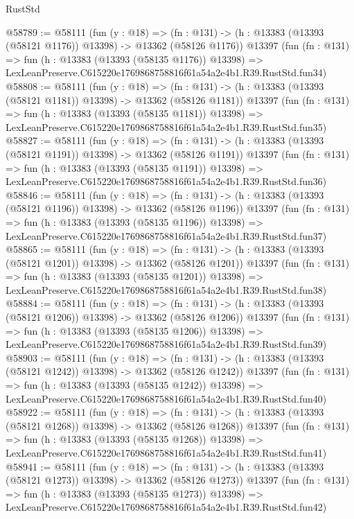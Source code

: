 \begin{lexlean}{RustStd}
\begin{coremodule}
@58789 := @58111
    (fun (y : @18) =>
    (fn : @131) -> (h : @13383 (@13393 (@58121 @1176)) @13398) -> @13362 (@58126 @1176))
    @13397
    (fun (fn : @131) =>
    fun (h : @13383 (@13393 (@58135 @1176)) @13398) =>
    LexLeanPreserve.C615220e1769868758816f61a54a2e4b1.R39.RustStd.fun34)
@58808 := @58111
    (fun (y : @18) =>
    (fn : @131) -> (h : @13383 (@13393 (@58121 @1181)) @13398) -> @13362 (@58126 @1181))
    @13397
    (fun (fn : @131) =>
    fun (h : @13383 (@13393 (@58135 @1181)) @13398) =>
    LexLeanPreserve.C615220e1769868758816f61a54a2e4b1.R39.RustStd.fun35)
@58827 := @58111
    (fun (y : @18) =>
    (fn : @131) -> (h : @13383 (@13393 (@58121 @1191)) @13398) -> @13362 (@58126 @1191))
    @13397
    (fun (fn : @131) =>
    fun (h : @13383 (@13393 (@58135 @1191)) @13398) =>
    LexLeanPreserve.C615220e1769868758816f61a54a2e4b1.R39.RustStd.fun36)
@58846 := @58111
    (fun (y : @18) =>
    (fn : @131) -> (h : @13383 (@13393 (@58121 @1196)) @13398) -> @13362 (@58126 @1196))
    @13397
    (fun (fn : @131) =>
    fun (h : @13383 (@13393 (@58135 @1196)) @13398) =>
    LexLeanPreserve.C615220e1769868758816f61a54a2e4b1.R39.RustStd.fun37)
@58865 := @58111
    (fun (y : @18) =>
    (fn : @131) -> (h : @13383 (@13393 (@58121 @1201)) @13398) -> @13362 (@58126 @1201))
    @13397
    (fun (fn : @131) =>
    fun (h : @13383 (@13393 (@58135 @1201)) @13398) =>
    LexLeanPreserve.C615220e1769868758816f61a54a2e4b1.R39.RustStd.fun38)
@58884 := @58111
    (fun (y : @18) =>
    (fn : @131) -> (h : @13383 (@13393 (@58121 @1206)) @13398) -> @13362 (@58126 @1206))
    @13397
    (fun (fn : @131) =>
    fun (h : @13383 (@13393 (@58135 @1206)) @13398) =>
    LexLeanPreserve.C615220e1769868758816f61a54a2e4b1.R39.RustStd.fun39)
@58903 := @58111
    (fun (y : @18) =>
    (fn : @131) -> (h : @13383 (@13393 (@58121 @1242)) @13398) -> @13362 (@58126 @1242))
    @13397
    (fun (fn : @131) =>
    fun (h : @13383 (@13393 (@58135 @1242)) @13398) =>
    LexLeanPreserve.C615220e1769868758816f61a54a2e4b1.R39.RustStd.fun40)
@58922 := @58111
    (fun (y : @18) =>
    (fn : @131) -> (h : @13383 (@13393 (@58121 @1268)) @13398) -> @13362 (@58126 @1268))
    @13397
    (fun (fn : @131) =>
    fun (h : @13383 (@13393 (@58135 @1268)) @13398) =>
    LexLeanPreserve.C615220e1769868758816f61a54a2e4b1.R39.RustStd.fun41)
@58941 := @58111
    (fun (y : @18) =>
    (fn : @131) -> (h : @13383 (@13393 (@58121 @1273)) @13398) -> @13362 (@58126 @1273))
    @13397
    (fun (fn : @131) =>
    fun (h : @13383 (@13393 (@58135 @1273)) @13398) =>
    LexLeanPreserve.C615220e1769868758816f61a54a2e4b1.R39.RustStd.fun42)

\end{coremodule}
\end{lexlean}
